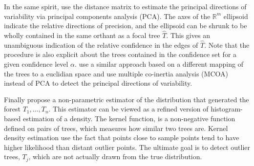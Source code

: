 

In the same spirit, \citet{willis2016confidence} use the distance matrix to
estimate  the  principal  directions  of  variability  via principal components analysis (PCA). The axes of the $\mathbb{R}^m$ ellipsoid indicate the relative directions of precision, and the ellipsoid can be shrunk  to be wholly contained in the same orthant as a focal tree $\hat{T}$. This gives an unambiguous indication of the relative confidence in the edges of $\hat{T}$. Note that the procedure is also explicit about the trees contained in the confidence set for a given confidence level $\alpha$. \citet{de2012phylo} use a similar approach based on a different mapping of the trees to a euclidian space and use multiple co-inertia analysis (MCOA) instead of PCA to detect the principal directions of variability.

Finally \citet{weyenberg2014kdetrees}  propose  a non-parametric estimator of the distribution that generated the forest $T_1,\ldots,T_n$.  This estimator can be viewed as a refined version of histogram-based estimation of a density. The kernel function, is a non-negative function defined on pairs of trees, which measures how similar two trees are. Kernel density estimation use the fact that points close to sample points tend to have higher likelihood than distant outlier points.  The ultimate goal is to detect outlier trees, $T_j$, which are not actually drawn from the true distribution.


